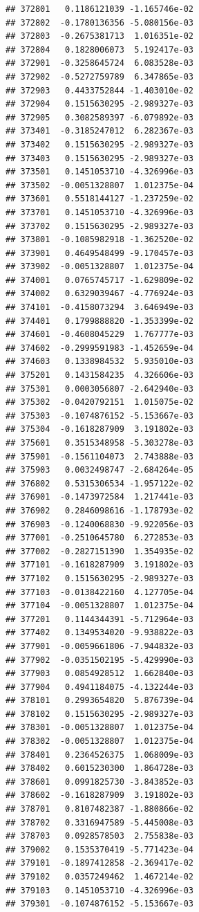 \documentclass[ignorenonframetext,]{beamer}
\begin{document}
\begin{frame}[fragile]
\begin{verbatim}
## 372801   0.1186121039 -1.165746e-02
## 372802  -0.1780136356 -5.080156e-03
## 372803  -0.2675381713  1.016351e-02
## 372804   0.1828006073  5.192417e-03
## 372901  -0.3258645724  6.083528e-03
## 372902  -0.5272759789  6.347865e-03
## 372903   0.4433752844 -1.403010e-02
## 372904   0.1515630295 -2.989327e-03
## 372905   0.3082589397 -6.079892e-03
## 373401  -0.3185247012  6.282367e-03
## 373402   0.1515630295 -2.989327e-03
## 373403   0.1515630295 -2.989327e-03
## 373501   0.1451053710 -4.326996e-03
## 373502  -0.0051328807  1.012375e-04
## 373601   0.5518144127 -1.237259e-02
## 373701   0.1451053710 -4.326996e-03
## 373702   0.1515630295 -2.989327e-03
## 373801  -0.1085982918 -1.362520e-02
## 373901   0.4649548499 -9.170457e-03
## 373902  -0.0051328807  1.012375e-04
## 374001   0.0765745717 -1.629809e-02
## 374002   0.6329039467 -4.776924e-03
## 374101  -0.4158073294  3.646949e-03
## 374401   0.1799888820 -1.353399e-02
## 374601  -0.4608045229  1.767777e-03
## 374602  -0.2999591983 -1.452659e-04
## 374603   0.1338984532  5.935010e-03
## 375201   0.1431584235  4.326606e-03
## 375301   0.0003056807 -2.642940e-03
## 375302  -0.0420792151  1.015075e-02
## 375303  -0.1074876152 -5.153667e-03
## 375304  -0.1618287909  3.191802e-03
## 375601   0.3515348958 -5.303278e-03
## 375901  -0.1561104073  2.743888e-03
## 375903   0.0032498747 -2.684264e-05
## 376802   0.5315306534 -1.957122e-02
## 376901  -0.1473972584  1.217441e-03
## 376902   0.2846098616 -1.178793e-02
## 376903  -0.1240068830 -9.922056e-03
## 377001  -0.2510645780  6.272853e-03
## 377002  -0.2827151390  1.354935e-02
## 377101  -0.1618287909  3.191802e-03
## 377102   0.1515630295 -2.989327e-03
## 377103  -0.0138422160  4.127705e-04
## 377104  -0.0051328807  1.012375e-04
## 377201   0.1144344391 -5.712964e-03
## 377402   0.1349534020 -9.938822e-03
## 377901  -0.0059661806 -7.944832e-03
## 377902  -0.0351502195 -5.429990e-03
## 377903   0.0854928512  1.662840e-03
## 377904   0.4941184075 -4.132244e-03
## 378101   0.2993654820  5.876739e-04
## 378102   0.1515630295 -2.989327e-03
## 378301  -0.0051328807  1.012375e-04
## 378302  -0.0051328807  1.012375e-04
## 378401   0.2364526375  1.068009e-03
## 378402   0.6015230300  1.864728e-03
## 378601   0.0991825730 -3.843852e-03
## 378602  -0.1618287909  3.191802e-03
## 378701   0.8107482387 -1.880866e-02
## 378702   0.3316947589 -5.445008e-03
## 378703   0.0928578503  2.755838e-03
## 379002   0.1535370419 -5.771423e-04
## 379101  -0.1897412858 -2.369417e-02
## 379102   0.0357249462  1.467214e-02
## 379103   0.1451053710 -4.326996e-03
## 379301  -0.1074876152 -5.153667e-03

\end{verbatim}
\end{frame}
\end{document}
